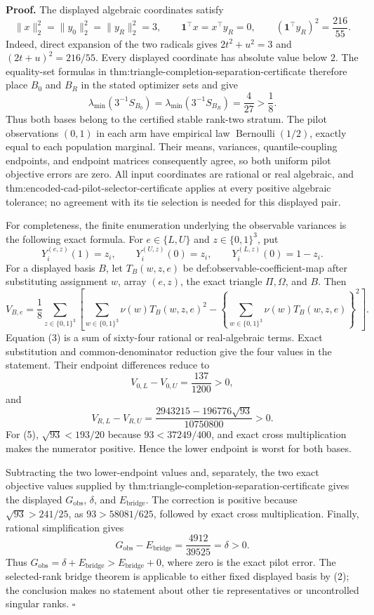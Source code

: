 \textbf{Proof.}
The displayed algebraic coordinates satisfy
\[
\lVert x\rVert_2^2=\lVert y_0\rVert_2^2
=\lVert y_R\rVert_2^2=3,
\qquad
\mathbf1^{\top}x=x^{\top}y_R=0,
\qquad
(\mathbf1^{\top}y_R)^2=\frac{216}{55}.
\tag{1}
\]
Indeed, direct expansion of the two radicals gives \(2t^2+u^2=3\) and \((2t+u)^2=216/55\).  Every displayed coordinate has absolute value below \(2\).  The equality-set formulas in thm:triangle-completion-separation-certificate therefore place \(B_0\) and \(B_R\) in the stated optimizer sets and give
\[
\lambda_{\min}(3^{-1}S_{B_0})
=\lambda_{\min}(3^{-1}S_{B_R})=\frac4{27}>\frac18.
\tag{2}
\]
Thus both bases belong to the certified stable rank-two stratum.  The pilot observations \((0,1)\) in each arm have empirical law \(\operatorname{Bernoulli}(1/2)\), exactly equal to each population marginal.  Their means, variances, quantile-coupling endpoints, and endpoint matrices consequently agree, so both uniform pilot objective errors are zero.  All input coordinates are rational or real algebraic, and thm:encoded-cad-pilot-selector-certificate applies at every positive algebraic tolerance; no agreement with its tie selection is needed for this displayed pair.

For completeness, the finite enumeration underlying the observable variances is the following exact formula.  For \(e\in\{L,U\}\) and \(z\in\{0,1\}^3\), put
\[
Y_i^{(e,z)}(1)=z_i,
\qquad
Y_i^{(U,z)}(0)=z_i,
\qquad
Y_i^{(L,z)}(0)=1-z_i.
\]
For a displayed basis \(B\), let \(T_B(w,z,e)\) be def:observable-coefficient-map after substituting assignment \(w\), array \((e,z)\), the exact triangle \(\Pi,\Omega\), and \(B\).  Then
\[
V_{B,e}
=\frac18\sum_{z\in\{0,1\}^3}
\left[
\sum_{w\in\{0,1\}^3}\nu(w)T_B(w,z,e)^2
-\left\{\sum_{w\in\{0,1\}^3}\nu(w)T_B(w,z,e)\right\}^2
\right].
\tag{3}
\]
Equation (3) is a sum of sixty-four rational or real-algebraic terms.  Exact substitution and common-denominator reduction give the four values in the statement.  Their endpoint differences reduce to
\[
V_{0,L}-V_{0,U}=\frac{137}{1200}>0,
\tag{4}
\]
and
\[
V_{R,L}-V_{R,U}
=\frac{2943215-196776\sqrt{93}}{10750800}>0.
\tag{5}
\]
For (5), \(\sqrt{93}<193/20\) because \(93<37249/400\), and exact cross multiplication makes the numerator positive.  Hence the lower endpoint is worst for both bases.

Subtracting the two lower-endpoint values and, separately, the two exact objective values supplied by thm:triangle-completion-separation-certificate gives the displayed \(G_{\mathrm{obs}}\), \(\delta\), and \(E_{\mathrm{bridge}}\).  The correction is positive because \(\sqrt{93}>241/25\), as \(93>58081/625\), followed by exact cross multiplication.  Finally, rational simplification gives
\[
G_{\mathrm{obs}}-E_{\mathrm{bridge}}
=\frac{4912}{39525}=\delta>0.
\tag{6}
\]
Thus \(G_{\mathrm{obs}}=\delta+E_{\mathrm{bridge}}>E_{\mathrm{bridge}}+0\), where zero is the exact pilot error.  The selected-rank bridge theorem is applicable to either fixed displayed basis by (2); the conclusion makes no statement about other tie representatives or uncontrolled singular ranks. \(\square\)